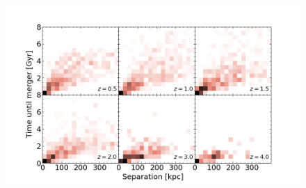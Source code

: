\documentclass[twocolumn]{aastex631}
\begin{document}
\begin{figure}[htb]
    \centering
    \includegraphics[width=\textwidth]{plots/bet-on-it/3_Timevssephigh-2d.png}
    \caption{}
\end{figure}










{}

\end{document}
